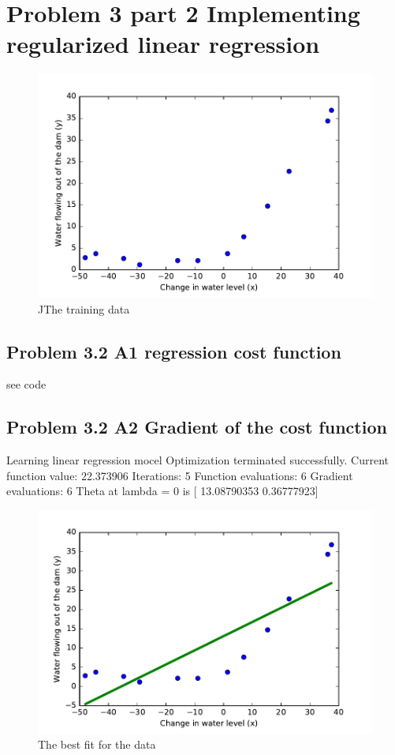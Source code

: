 \documentclass[pdftex,11pt]{article}
\begin{document}
\section{Problem 3 part 2 Implementing regularized linear regression}
\begin{figure}
  \caption{JThe training data}
  \centering
    \includegraphics[scale=1]{fig6.pdf}
\end{figure}

\subsection{Problem 3.2 A1 regression cost function }
see code


\subsection{Problem 3.2 A2 Gradient of the cost function }
Learning linear regression mocel
Optimization terminated successfully.
         Current function value: 22.373906
         Iterations: 5
         Function evaluations: 6
         Gradient evaluations: 6
Theta at lambda = 0 is  [ 13.08790353   0.36777923]

\begin{figure}
  \caption{The best fit for the data}
  \centering
    \includegraphics[scale=1]{fig7.pdf}
\end{figure}
\end{document}
